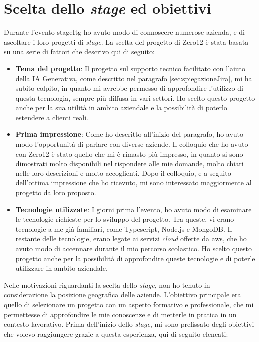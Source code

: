 \section{Scelta dello \textit{stage} ed obiettivi} \label{sec:sceltaStage}
Durante l'evento \gls{stageItg} ho avuto modo di connoscere numerose azienda, e di ascoltare i loro progetti di \textit{stage}. 
La scelta del progetto di Zero12 è stata basata su una serie di fattori che descrivo qui di seguito:
\begin{itemize}
    \item \textbf{Tema del progetto}: Il progetto sul supporto tecnico facilitato con l'aiuto della IA Generativa, come descritto nel paragrafo \ref{sec:spiegazioneJira}, mi ha subito colpito, in quanto mi avrebbe permesso di approfondire l'utilizzo di questa tecnologia, sempre più diffusa in vari settori. Ho scelto questo progetto anche per la sua utilità in ambito aziendale e la possibilità di poterlo estendere a clienti reali.
    \item \textbf{Prima impressione}: Come ho descritto all'inizio del paragrafo, ho avuto modo l'opportunità di parlare con diverse aziende. Il colloquio che ho avuto con Zero12 è stato quello che mi è rimasto più impresso, in quanto si sono dimostrati molto disponibili nel rispondere alle mie domande, molto chiari nelle loro descrizioni e molto accoglienti. Dopo il colloquio, e a seguito dell'ottima impressione che ho ricevuto, mi sono interessato maggiormente al progetto da loro proposto.
    \item \textbf{Tecnologie utilizzate}: I giorni prima l'evento, ho avuto modo di esaminare le tecnologie richieste per lo sviluppo del progetto. Tra queste, vi erano tecnologie a me già familiari, come Typescript, Node.js e MongoDB. Il restante delle tecnologie, erano legate ai servizi \textit{cloud} offerte da \gls{aws}, che ho avuto modo di accennare durante il mio percorso scolastico. Ho scelto questo progetto anche per la possibilità di approfondire queste tecnologie e di poterle utilizzare in ambito aziendale.
\end{itemize}
Nelle motivazioni riguardanti la scelta dello \textit{stage}, non ho tenuto in considerazione la posizione geografica delle aziende. L'obiettivo principale era quello di selezionare un progetto con un aspetto formativo e professionale, che mi permettesse di approfondire le mie conoscenze e di metterle in pratica in un contesto lavorativo.
Prima dell'inizio dello \textit{stage}, mi sono prefissato degli obiettivi che volevo raggiungere grazie a questa esperienza, qui di seguito elencati:
